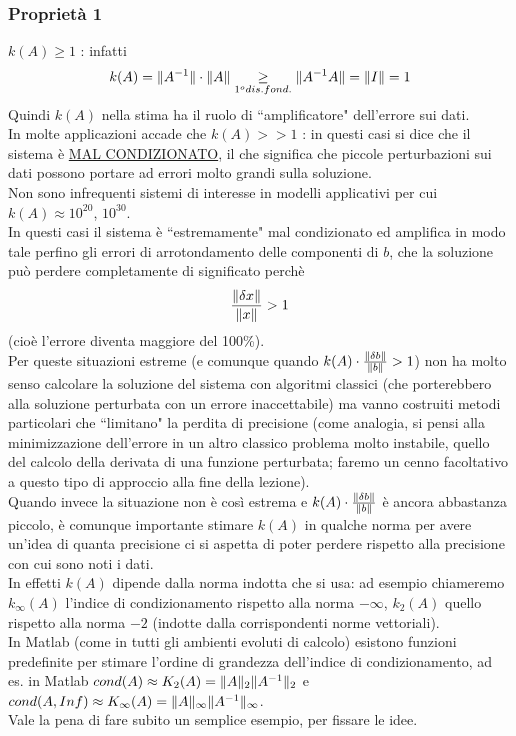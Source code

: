 \subsubsection{Proprietà 1}
$k(A)\geq1$ : infatti
\begin{equation*}
    k(A)=\lVert A^{-1}\rVert\cdot\lVert A\rVert\underset{1^o dis. fond.}{\geq}\lVert A^{-1}A\rVert=\lVert I\rVert=1
\end{equation*}
Quindi $k(A)$ nella stima ha il ruolo di ``amplificatore" dell'errore sui dati.\\ In molte applicazioni accade che $k(A)>>1$ : in questi casi si dice che il sistema è \uline{MAL CONDIZIONATO}, il che significa che piccole perturbazioni sui dati possono portare ad errori molto grandi sulla soluzione.\\
Non sono infrequenti sistemi di interesse in modelli applicativi per cui $k(A)\approx10^{20}$, $10^{30}$.\\In questi casi il sistema è ``estremamente" mal condizionato ed amplifica in modo tale perfino gli errori di arrotondamento delle componenti di $b$, che la soluzione può perdere completamente di significato perchè
\begin{equation*}
    \frac{\lVert\delta x\rVert}{\lVert x\rVert}>1
\end{equation*}
(cioè l'errore diventa maggiore del 100\%).\\Per queste situazioni estreme (e comunque quando $k(A)\cdot\frac{\lVert\delta b\rVert}{\lVert b\rVert}>1$) non ha molto senso calcolare la soluzione del sistema con algoritmi classici (che porterebbero alla soluzione perturbata con un errore inaccettabile) ma vanno costruiti metodi particolari che ``limitano" la perdita di precisione (come analogia, si pensi alla minimizzazione dell'errore in un altro classico problema molto instabile, quello del calcolo della derivata di una funzione perturbata; faremo un cenno facoltativo a questo tipo di approccio alla fine della lezione).\\Quando invece la situazione non è così estrema e $k(A)\cdot\frac{\lVert\delta b\rVert}{\lVert b\rVert}$ è ancora abbastanza piccolo, è comunque importante stimare $k(A)$ in qualche norma per avere un'idea di quanta precisione ci si aspetta di poter perdere rispetto alla precisione con cui sono noti i dati.\\In effetti $k(A)$ dipende dalla norma indotta che si usa: ad esempio chiameremo $k_\infty(A)$ l'indice di condizionamento rispetto alla norma $-\infty$, $k_2(A)$ quello rispetto alla norma $-2$ (indotte dalla corrispondenti norme vettoriali).\\In Matlab (come in tutti gli ambienti evoluti di calcolo) esistono funzioni predefinite per stimare l'ordine di grandezza dell'indice di condizionamento, ad es. in Matlab $cond(A) \approx K_2(A) = \lVert A\rVert_2 \lVert A^{-1}\rVert_2$ e $cond(A,Inf) \approx K_\infty(A) = \lVert A\rVert_\infty \lVert A^{-1}\rVert_\infty$.\\
Vale la pena di fare subito un semplice esempio, per fissare le idee.

